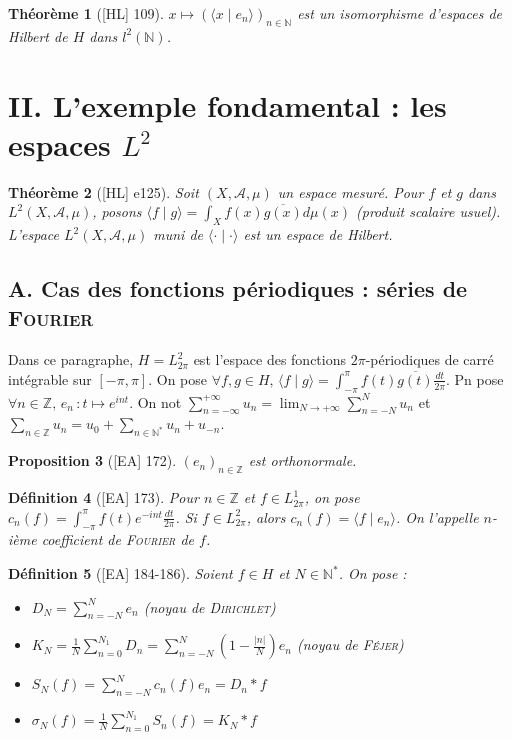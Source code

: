 \documentclass[10pt, a4paper, parskip=full, twoside, twocolumn]{report}
\newtheorem{definition}{Définition}
\newtheorem{theorem}[definition]{Théorème}
\newtheorem{proposition}[definition]{Proposition}
\newcommand{\IN}{\mathbb{N}}
\newcommand{\IZ}{\mathbb{Z}}
\newcommand{\A}{\mathscr{A}}
\newcommand{\ps}[2]{\langle #1\mid #2\rangle}
\begin{document}
\begin{theorem}[\textnormal{[HL] 109}]
	$x\mapsto (\ps{x}{e_n})_{n\in \IN}$ est un isomorphisme d'espaces de Hilbert de $H$ dans $l^2(\IN)$.
\end{theorem}

\section*{II. L'exemple fondamental : les espaces $L^2$}
\begin{theorem}[\textnormal{[HL] e125}]
	Soit $(X,\A, \mu)$ un espace mesuré. Pour $f$ et $g$ dans $L^2(X,\A,\mu)$, posons $\ps{f}{g}= \int_{X}f(x)\overline{g(x)}d\mu(x)$ (produit scalaire usuel).
	L'espace $L^2(X,\A,\mu)$ muni de $\ps{\cdot}{\cdot}$ est un espace de Hilbert.
\end{theorem}

\subsection*{A. Cas des fonctions périodiques : séries de \textsc{Fourier}}
\textcolor{paragraphtext}{Dans ce paragraphe, $H = L^2_{2\pi}$ est l'espace des fonctions $2\pi$-périodiques de carré intégrable sur $[-\pi,\pi]$.
On pose $\forall f,g\in H,\, \ps{f}{g} = \int_{-\pi}^{\pi}f(t)\overline{g(t)}\frac{dt}{2\pi}$. Pn pose $\forall n\in \IZ,\, e_n\,\colon t\mapsto e^{int}$. On not $\sum_{n=-\infty}^{+\infty} u_n = \lim_{N\to +\infty}\sum_{n=-N}^{N} u_n$
et $\sum_{n\in \IZ}u_n = u_0 + \sum_{n\in\IN^*} u_n + u_{-n}$.}

\begin{proposition}[\textnormal{[EA] 172}]
	$\left(e_n\right)_{n\in \IZ}$ est orthonormale.
\end{proposition}

\begin{definition}[\textnormal{[EA] 173}]
	Pour $n\in \IZ$ et $f\in L_{2\pi}^1$, on pose $c_n(f) = \int_{-\pi}^{\pi}f(t)e^{-int}\frac{dt}{2\pi}$.
	Si $f\in L^2_{2\pi}$, alors $c_n(f)=\ps{f}{e_n}$. On l'appelle \emph{$n$-ième coefficient de \textsc{Fourier} de $f$}.
\end{definition}

\begin{definition}[\textnormal{[EA] 184-186}]
	Soient $f\in H$ et $N\in \IN^*$. On pose :
	\begin{itemize}
		\item $D_N = \sum_{n=-N}^{N} e_n$ (\emph{noyau de \textsc{Dirichlet}})
		\item $K_N = \frac{1}{N}\sum_{n=0}^{N_1} D_n = \sum_{n=-N}^{N} (1-\frac{\vert n\vert}{N})e_n$ (\emph{noyau de \textsc{Féjer}})
		\item $S_N(f) = \sum_{n=-N}^{N}c_n(f)e_n = D_n * f$
		\item $\sigma_N(f) = \frac{1}{N}\sum_{n=0}^{N_1}S_n(f) = K_N * f$
	\end{itemize}
\end{definition}
\end{document}
